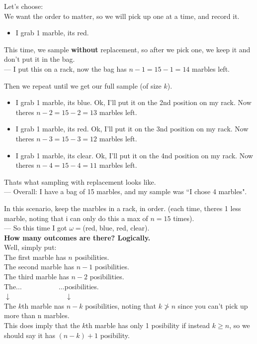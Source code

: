 \documentclass[12pt]{book}
\begin{document}
\noindent Let's choose: \\
We want the order to matter, so we will pick up one at a time, and record it.
\begin{itemize}
\item I grab 1 marble, its red.
\end{itemize}
This time, we sample \textbf{without} replacement, so after we pick one, we keep it and don't put it in the bag. \\
--- I put this on a rack, now the bag has $n-1=15-1=14$ marbles left.

\noindent Then we repeat until we get our full sample (of size $k$). 
\begin{itemize}
\item I grab 1 marble, its blue. Ok, I'll put it on the 2nd position on my rack. Now theres $n-2=15-2=13$ marbles left.
\item I grab 1 marble, its red. Ok, I'll put it on the 3nd position on my rack. Now theres $n-3=15-3=12$ marbles left.
\item I grab 1 marble, its clear. Ok, I'll put it on the 4nd position on my rack. Now theres $n-4=15-4=11$ marbles left.
\end{itemize}
Thats what sampling with replacement looks like. \\
--- Overall: I have a bag of 15 marbles, and my sample was ``I chose 4 marbles". 

In this scenario, keep the marbles in a rack, in order. (each time, theres 1 less marble, noting that i can only do this a max of $n=15$ times).\\
--- So this time I got $\omega =$(red, blue, red, clear).\\

\noindent \textbf{How many outcomes are there? Logically.} \\
Well, simply put:\\
The first marble has $n$ posibilities. \\
The second marble has $n-1$ posibilities.\\
The third marble has $n-2$ posibilities.\\
The...$~~~~~~~~~~~~~~~~~~~~~~~~$...posibilities.\\
$\downarrow ~~~~~~~~~~~~~~~~~~~~~~~~~~~~~~~~~~~\downarrow$\\
The $k$th marble nas $n-k$ posibilities, noting that $k\ngtr n$ since you can't pick up more than n marbles. \\
This does imply that the $k$th marble has only 1 posibility if instead $k\geq n$, so we should say it has $(n-k) + 1$ posibility.
\end{document}
